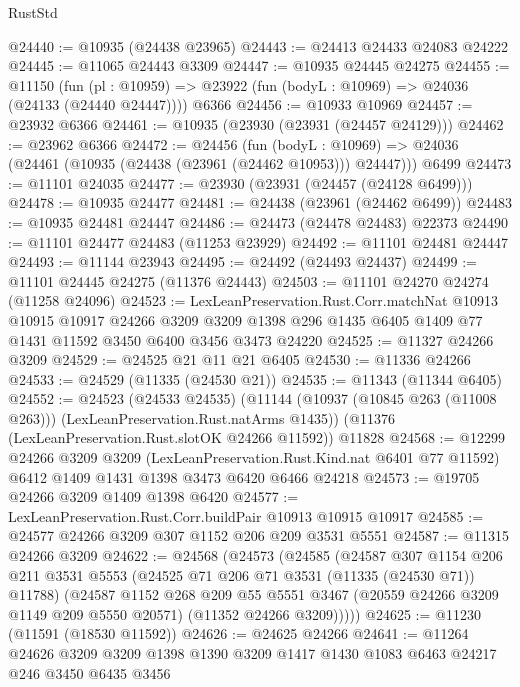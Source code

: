 \begin{lexlean}{RustStd}
\begin{coremodule}
{{{{{{{{{{{{{{{{{{{@24440 := @10935 (@24438 @23965)
@24443 := @24413 @24433 @24083 @24222
@24445 := @11065 @24443 @3309
@24447 := @10935 @24445 @24275
@24455 := @11150
    (fun (pl : @10959) => @23922 (fun (bodyL : @10969) => @24036 (@24133 (@24440 @24447))))
    @6366
@24456 := @10933 @10969
@24457 := @23932 @6366
@24461 := @10935 (@23930 (@23931 (@24457 @24129)))
@24462 := @23962 @6366
@24472 := @24456
    (fun (bodyL : @10969) => @24036 (@24461 (@10935 (@24438 (@23961 (@24462 @10953))) @24447)))
    @6499
@24473 := @11101 @24035
@24477 := @23930 (@23931 (@24457 (@24128 @6499)))
@24478 := @10935 @24477
@24481 := @24438 (@23961 (@24462 @6499))
@24483 := @10935 @24481 @24447
@24486 := @24473 (@24478 @24483) @22373
@24490 := @11101 @24477 @24483 (@11253 @23929)
@24492 := @11101 @24481 @24447
@24493 := @11144 @23943
@24495 := @24492 (@24493 @24437)
@24499 := @11101 @24445 @24275 (@11376 @24443)
@24503 := @11101 @24270 @24274 (@11258 @24096)
@24523 := LexLeanPreservation.Rust.Corr.matchNat
    @10913
    @10915
    @10917
    @24266
    @3209
    @3209
    @1398
    @296
    @1435
    @6405
    @1409
    @77
    @1431
    @11592
    @3450
    @6400
    @3456
    @3473
    @24220
@24525 := @11327 @24266 @3209
@24529 := @24525 @21 @11 @21 @6405
@24530 := @11336 @24266
@24533 := @24529 (@11335 (@24530 @21))
@24535 := @11343 (@11344 @6405)
@24552 := @24523
    (@24533 @24535)
    (@11144 (@10937 (@10845 @263 (@11008 @263))) (LexLeanPreservation.Rust.natArms @1435))
    (@11376 (LexLeanPreservation.Rust.slotOK @24266 @11592))
    @11828
@24568 := @12299
    @24266
    @3209
    @3209
    (LexLeanPreservation.Rust.Kind.nat @6401 @77 @11592)
    @6412
    @1409
    @1431
    @1398
    @3473
    @6420
    @6466
    @24218
@24573 := @19705 @24266 @3209 @1409 @1398 @6420
@24577 := LexLeanPreservation.Rust.Corr.buildPair @10913 @10915 @10917
@24585 := @24577 @24266 @3209 @307 @1152 @206 @209 @3531 @5551
@24587 := @11315 @24266 @3209
@24622 := @24568
    (@24573
      (@24585
        (@24587
          @307
          @1154
          @206
          @211
          @3531
          @5553
          (@24525 @71 @206 @71 @3531 (@11335 (@24530 @71)) @11788)
          (@24587
            @1152
            @268
            @209
            @55
            @5551
            @3467
            (@20559 @24266 @3209 @1149 @209 @5550 @20571)
            (@11352 @24266 @3209)))))
@24625 := @11230 (@11591 (@18530 @11592))
@24626 := @24625 @24266
@24641 := @11264
    @24626
    @3209
    @3209
    @1398
    @1390
    @3209
    @1417
    @1430
    @1083
    @6463
    @24217
    @246
    @3450
    @6435
    @3456
}}}}}}}}}}}}}}}}}}}
\end{coremodule}
\end{lexlean}
